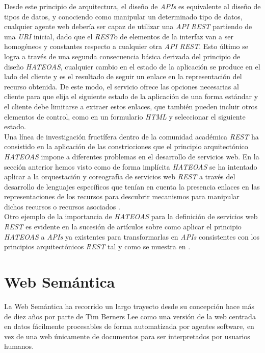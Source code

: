 Desde este principio de arquitectura, el dise\~no de \textit{APIs} es equivalente al dise\~no de tipos de datos, y conociendo como manipular un determinado tipo de datos, cualquier agente web deber\'ia ser capaz de utilizar una \textit{API} \textit{REST} partiendo de una \textit{URI} inicial, dado que el \textit{REST}o de elementos de la interfaz van a ser homog\'eneos y constantes respecto a cualquier otra \textit{API} \textit{REST}. Esto \'ultimo se logra a trav\'es de una segunda consecuencia b\'asica derivada del principio de dise\~no \textit{HATEOAS}, cualquier cambio en el estado de la aplicaci\'on se produce en el lado del cliente y es el resultado de seguir un enlace en la representaci\'on del recurso obtenida. De este modo, el servicio ofrece las opciones necesarias al cliente para que elija el siguiente estado de la aplicaci\'on de una forma est\'andar y el cliente debe limitarse a extraer estos enlaces, que tambi\'en pueden incluir otros elementos de control, como en un formulario \textit{HTML} y seleccionar el siguiente estado.\\

Una l\'inea de investigaci\'on fruct\'ifera dentro de la comunidad acad\'emica \textit{REST} ha consistido en la aplicaci\'on de las constricciones que el principio arquitect\'onico \textit{HATEOAS} impone a diferentes problemas en el desarrollo de servicios web. En la secci\'on anterior hemos visto como de forma impl\'icita \textit{HATEOAS} se ha intentado aplicar a la orquestaci\'on y coreograf\'ia de servicios web \textit{REST} a trav\'es del desarrollo de lenguajes espec\'ificos que ten\'ian en cuenta la presencia enlaces en las representaciones de los recursos para descubrir mecanismos para manipular dichos recursos o recursos asociados \cite{alarcon2011hypermedia}.\\
Otro ejemplo de la importancia de \textit{HATEOAS} para la definici\'on de servicios web \textit{REST} es evidente en la sucesi\'on de art\'iculos sobre como aplicar el principio \textit{HATEOAS} a \textit{APIs} ya existentes para transformarlas en \textit{APIs} consistentes con los principios arquitect\'onicos \textit{REST} tal y como se muestra en \cite{liskin2011teaching}.

\section{Web Sem\'antica}

La Web Sem\'antica ha recorrido un largo trayecto desde su concepci\'on hace m\'as de diez a\~nos por parte de Tim Berners Lee como una versi\'on de la web centrada en datos f\'acilmente procesables de forma automatizada por agentes software, en vez de una web \'unicamente de documentos para ser interpretados por usuarios humanos.\\

